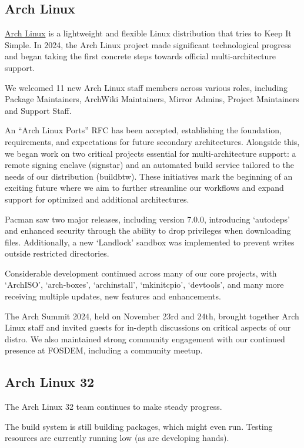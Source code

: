 \documentclass[a4paper]{report}
\begin{document}
\subsection{Arch Linux}

\href{https://archlinux.org/}{Arch Linux} is a lightweight and flexible Linux distribution that tries to Keep It Simple. In 2024, the Arch Linux project made significant technological progress and began taking the first concrete steps towards official multi-architecture support.

We welcomed 11 new Arch Linux staff members across various roles, including Package Maintainers, ArchWiki Maintainers, Mirror Admins, Project Maintainers and Support Staff.

An “Arch Linux Ports” RFC has been accepted, establishing the foundation, requirements, and expectations for future secondary architectures. Alongside this, we began work on two critical projects essential for multi-architecture support: a remote signing enclave (signstar) and an automated build service tailored to the needs of our distribution (buildbtw). These initiatives mark the beginning of an exciting future where we aim to further streamline our workflows and expand support for optimized and additional architectures.

Pacman saw two major releases, including version 7.0.0, introducing `autodeps' and enhanced security through the ability to drop privileges when downloading files. Additionally, a new `Landlock' sandbox was implemented to prevent writes outside restricted directories.

Considerable development continued across many of our core projects, with `ArchISO', `arch-boxes', `archinstall', `mkinitcpio', `devtools', and many more receiving multiple updates, new features and enhancements.

The Arch Summit 2024, held on November 23rd and 24th, brought together Arch Linux staff and invited guests for in-depth discussions on critical aspects of our distro. We also maintained strong community engagement with our continued presence at FOSDEM, including a community meetup.

\subsection{Arch Linux 32}

The Arch Linux 32 team continues to make steady progress.

The build system is still building packages, which might even run. Testing resources are currently running low (as are developing hands).
\end{document}
